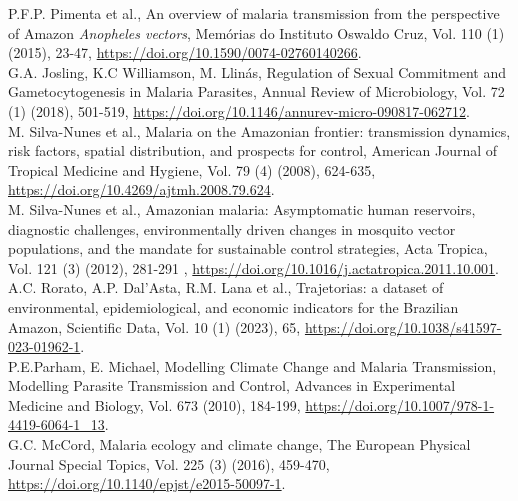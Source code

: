\documentclass[a4paper,fleqn]{cas-dc}
\begin{document}
 \begin{thebibliography}{00}


 P.F.P. Pimenta et al., An overview of malaria transmission from the perspective of Amazon \emph{Anopheles vectors}, Memórias do Instituto Oswaldo Cruz, Vol. 110 (1) (2015), 23-47, \href{https://doi.org/10.1590/0074-02760140266}{https://doi.org/10.1590/0074-02760140266}.
\\
 G.A. Josling, K.C Williamson, M. Llinás, Regulation of Sexual Commitment and Gametocytogenesis in Malaria Parasites, Annual Review of Microbiology, Vol. 72 (1) (2018), 501-519, \href{https://doi.org/10.1146/annurev-micro-090817-062712}{https://doi.org/10.1146/annurev-micro-090817-062712}.
\\
 M. Silva-Nunes et al., Malaria on the Amazonian frontier: transmission dynamics, risk factors, spatial distribution, and prospects for control, American Journal of Tropical Medicine and Hygiene, Vol. 79 (4) (2008), 624-635, \href{https://doi.org/10.4269/ajtmh.2008.79.624}{https://doi.org/10.4269/ajtmh.2008.79.624}. 
\\
 M. Silva-Nunes et al.,  Amazonian malaria: Asymptomatic human reservoirs, diagnostic challenges, environmentally driven changes in mosquito vector populations, and the mandate for sustainable control strategies, Acta Tropica, Vol. 121 (3) (2012), 281-291 , \href{https://doi.org/10.1016/j.actatropica.2011.10.001}{https://doi.org/10.1016/j.actatropica.2011.10.001}.
\\
 A.C. Rorato, A.P. Dal’Asta, R.M. Lana et al., Trajetorias: a dataset of environmental, epidemiological, and economic indicators for the Brazilian Amazon, Scientific Data, Vol. 10 (1) (2023), 65, \href{https://doi.org/10.1038/s41597-023-01962-1}{https://doi.org/10.1038/s41597-023-01962-1}.
\\
 P.E.Parham, E. Michael, Modelling Climate Change and Malaria Transmission, Modelling Parasite Transmission and Control, Advances in Experimental Medicine and Biology, Vol. 673 (2010), 184-199, \href{https://doi.org/10.1007/978-1-4419-6064-1_13}{https://doi.org/10.1007/978-1-4419-6064-1\_13}.
\\
 G.C. McCord, Malaria ecology and climate change, The European Physical Journal Special Topics, Vol. 225 (3) (2016), 459-470, \href{https://doi.org/10.1140/epjst/e2015-50097-1}{https://doi.org/10.1140/epjst/e2015-50097-1}.

\end{thebibliography}
\end{document}

